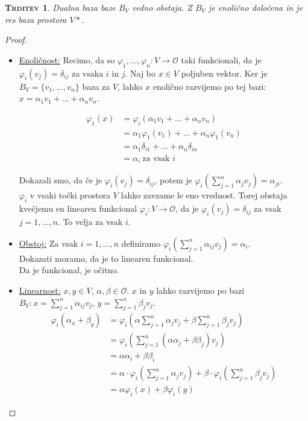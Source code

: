 \documentclass[a4paper,12pt]{article}
\newcommand{\OO}{\mathcal{O}}
\newtheorem*{trditev}{\textsc{Trditev}}
\begin{document}
\begin{trditev}
	Dualna baza baze $B_V$  vedno obstaja. Z $B_V$ je enolično določena in je res baza prostora $V*$. \\
\end{trditev}

\begin{proof} ~ 
	\begin{itemize}
		\item \underline{Enoličnost:} Recimo, da so $\varphi_1,\ldots,\varphi_n:V\to \OO$ taki funkcionali, da je $\varphi_i(v_j)=\delta_{ij}$ za vsaka $i$ in $j$. Naj bo $x\in V$ poljuben vektor. Ker je $B_V=\{v_1,\ldots,v_n\}$ baza za $V$, lahko $x$ enolično razvijemo po tej bazi: $x=\alpha_1 v_1+\ldots +\alpha_n v_n$.

		\begin{align*}
			\varphi_1(x)&=\varphi_i(\alpha_1 v_1+\ldots+\alpha_n v_n) \\
			&= \alpha_1 \varphi_1(v_1)+\ldots+\alpha_n \varphi_1(v_n) \\
			&= \alpha_1 \delta_{i1} +\ldots + \alpha_n \delta_{in} \\
			&= \alpha_i~\text{za vsak $i$}
		\end{align*}
		
		Dokazali smo, da če je $\varphi_i(v_j)=\delta_{ij}$, potem je $\varphi_i(\sum_{j=1}^n \alpha_j v_j)=\alpha_{ji}$. \\

		$\varphi_i$ v vsaki točki prostora $V$ lahko zavzame le eno vrednost. Torej obstaja kvečjemu en linearen funkcional $\varphi_i:V\to \OO$, da je $\varphi_i(v_j)=\delta_{ij}$ za vsak $j=1,\ldots,n$. To velja za vsak $i$. \\

		\item \underline{Obstoj:} Za vsak $i=1,\ldots,n$ definiramo $\varphi_i(\sum_{j=1}^n \alpha_{ij}v_j )=\alpha_i$. \\
		
		Dokazati moramo, da je to linearen funkcional. \\

		Da je funkcional, je očitno. 

		\newpage 

		\item \underline{Linearnost:} $x,y\in V$, $\alpha,\beta \in \OO$. $x$ in $y$ lahko razvijemo po bazi $B_V:x=\sum_{j=1}^n\alpha_{ij}v_j$, $y=\sum_{j=1}^n\beta_jv_j$. 
		\begin{align*}
			\varphi_i(\alpha_x+\beta_y) &= \varphi_i(\alpha \sum_{j=1}^n \alpha_jv_j+\beta \sum_{j=1}^n\beta_jv_j) \\
			&= \varphi_i(\sum_{j=1}^n(\alpha \alpha_j+\beta \beta_j)v_j)\\
			&= \alpha \alpha_i+\beta \beta_i \\
			&= \alpha \cdot \varphi_i(\sum_{j=1}^n\alpha_jv_j)+\beta\cdot \varphi_i(\sum_{j=1}^n\beta_jv_j) \\
			&= \alpha \varphi_i(x)+\beta \varphi_i(y)
		\end{align*}


\end{itemize}
\end{proof}
\end{document}
